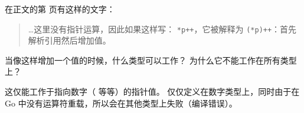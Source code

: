 \begin{Exercise}[title={指针运算},difficulty=4]
\label{ex:pointer arithmetic}
\Question
在正文的第 \pageref{main:pointer arithmetic} 页有这样的文字：

\begin{quote}
\ldots 这里没有指针运算，因此如果这样写：
\lstinline{*p++}，它被解释为 \lstinline{(*p)++}：首先解析引用然后增加值。
\end{quote}

当像这样增加一个值的时候，什么类型可以工作？
\Question 为什么它不能工作在所有类型上？

\end{Exercise}

\begin{Answer}
\Question 这仅能工作于指向数字（ 等等）的指针值。 
\Question \func{++} 仅仅定义在数字类型上，同时由于在 Go 中没有运算符重载，所以会在其他类型上失败（编译错误）。
\end{Answer}

